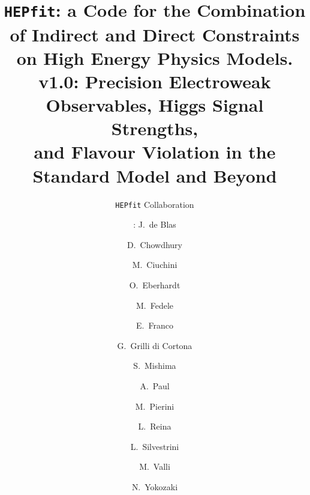 \documentclass[preprint,3p,12pt]{elsarticle}
\newcommand{\HEPfit}{\texttt{HEPfit}\xspace}
\begin{document}
\begin{frontmatter}



\title{\HEPfit: a Code for the Combination of Indirect and Direct
  Constraints\\ on High Energy Physics Models. \\
  v1.0: Precision Electroweak Observables, Higgs Signal Strengths,\\ and Flavour Violation in the
  Standard Model and Beyond}

\author[]{\HEPfit Collaboration }
\author[a]{\hspace*{-8pt}\colorbox{white}{}\hspace*{-4pt}: J.~de Blas}
\author[a]{D.~Chowdhury}
\author[b]{M.~Ciuchini}
\author[a]{O.~Eberhardt}
\author[a]{M.~Fedele}
\author[a]{E.~Franco}
\author[c]{G.~Grilli di Cortona}
\author[d]{S.~Mishima}
\author[a]{A.~Paul}
\author[e]{M.~Pierini}
\author[f]{L.~Reina}
\author[a]{L.~Silvestrini}
\author[g]{M.~Valli}
\author[h]{N.~Yokozaki}

\address[a]{INFN, Sezione di Roma, Piazzale A. Moro 2, I-00185 Roma, Italy}
\address[b]{INFN,  Sezione di Roma Tre, Via della Vasca Navale 84, I-00146 Roma, Italy}
\address[c]{Sao Paolo, Brazil}
\address[d]{Institute of Particle and Nuclear Studies, KEK, Tsukuba 305-0801, Japan}
\address[e]{CERN}
\address[f]{Physics Department, Florida State University, Tallahassee, FL 32306-4350, USA}
\address[g]{SISSA, via Bonomea 265, I-34136 Trieste, Italy and INFN, Sezione di Trieste, via Valerio 2, I-34127 Trieste, Italy}
\address[h]{Department of Physics, Tohoku University, Sendai, Miyagi 980-8578, Japan}


\end{frontmatter}
\end{document}
